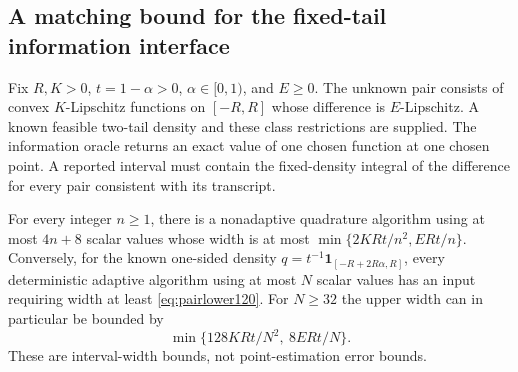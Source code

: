 \subsection{A matching bound for the fixed-tail information interface}
\begin{proposition}
\label{prop:pairinformation120}
Fix $R,K>0$, $t=1-\alpha>0$, $\alpha\in[0,1)$, and $E\ge0$.
The unknown pair consists of convex $K$-Lipschitz functions on
$[-R,R]$ whose difference is $E$-Lipschitz.  A known feasible
two-tail density and these class restrictions are supplied.
The information oracle returns an exact value of one chosen
function at one chosen point.  A reported interval must contain
the fixed-density integral of the difference for every pair
consistent with its transcript.

For every integer $n\ge1$, there is a nonadaptive quadrature
algorithm using at most $4n+8$ scalar values whose width is at most
$\min\{2KRt/n^2,ERt/n\}$.
Conversely, for the known one-sided density
$q=t^{-1}\boldsymbol1_{[-R+2R\alpha,R]}$, every deterministic
adaptive algorithm using at most $N$ scalar values has an input
requiring width at least \eqref{eq:pairlower120}.
For $N\ge32$ the upper width can in particular be bounded by
\[
 \min\{128KRt/N^2,\ 8ERt/N\}.
\]
These are interval-width bounds, not point-estimation error bounds.
\end{proposition}

